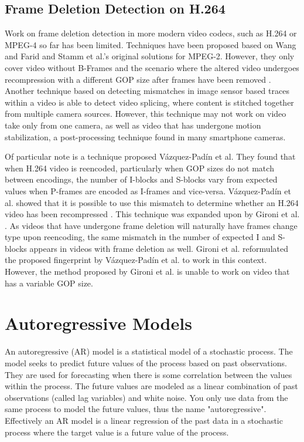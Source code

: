 \subsection{Frame Deletion Detection on H.264}

Work on frame deletion detection in more modern video codecs, such as H.264 or MPEG-4 so far has been limited. Techniques have been proposed based on Wang and Farid and Stamm et al.'s original solutions for MPEG-2. However, they only cover video without B-Frames and the scenario where the altered video undergoes recompression with a different GOP size after frames have been removed \cite{Liu}. Another technique based on detecting mismatches in image sensor based traces within a video \cite{Mandelli} is able to detect video splicing, where content is stitched together from multiple camera sources. However, this technique may not work on video take only from one camera, as well as video that has undergone motion stabilization, a post-processing technique found in many smartphone cameras.

Of particular note is a technique proposed V\'azquez-Pad\'in et al. They found that when H.264 video is reencoded, particularly when GOP sizes do not match between encodings, the number of I-blocks and S-blocks vary from expected values when P-frames are encoded as I-frames and vice-versa. V\'azquez-Pad\'in et al. showed that it is possible to use this mismatch to determine whether an H.264 video has been recompressed \cite{Vazquez}. This technique was expanded upon by Gironi et al. \cite{barni}. As videos that have undergone frame deletion will naturally have frames change type upon reencoding, the same mismatch in the number of expected I and S-blocks appears in videos with frame deletion as well. Gironi et al. reformulated the proposed fingerprint by V\'azquez-Pad\'in et al. to work in this context. However, the method proposed by Gironi et al. is unable to work on video that has a variable GOP size.

\section{Autoregressive Models}

An autoregressive (AR) model is a statistical model of a stochastic process. The model seeks to predict future values of the process based on past observations. They are used for forecasting when there is some correlation between the values within the process. The future values are modeled as a linear combination of past observations (called lag variables) and white noise. You only use data from the same process to model the future values, thus the name "autoregressive". Effectively an AR model is a linear regression of the past data in a stochastic process where the target value is a future value of the process.

